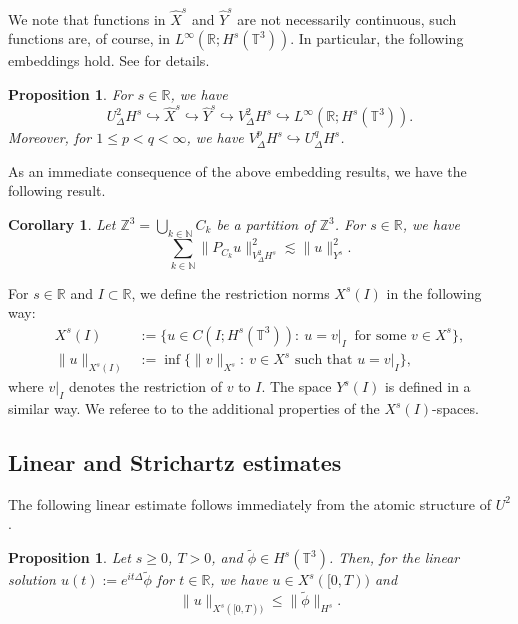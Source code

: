\documentclass[letterpaper, 11pt,  reqno]{amsart}
\newtheorem{proposition}[theorem]{Proposition}
\newtheorem{corollary}[theorem]{Corollary}
\newcommand{\1}{\hspace{0.5mm}\text{I}\hspace{0.5mm}}
\newcommand{\Z}{\mathbb{Z}}
\newcommand{\R}{\mathbb{R}}
\newcommand{\T}{\mathbb{T}}
\newcommand{\Dl}{\Delta}
\newcommand{\ft}{\widehat}
\newcommand{\wt}{\widetilde}
\newcommand{\les}{\lesssim}
\newcommand{\N}{\mathbb{N}}
\numberwithin{equation}{section}
\numberwithin{theorem}{section}
\begin{document}
We note that functions in $\ft X^{s} $ and $\ft Y^{s} $
are not necessarily continuous, 
such functions are, 
 of course, in $L^\infty (\R; H^s (\T^3))$.
 In particular,
the following embeddings hold. See \cite{HTT11} for details.

\begin{proposition}\label{Prop:emb}
For $s \in \R$,
we have
\[
   U^2_\Delta H^s \hookrightarrow \ft X^s \hookrightarrow \ft Y^s
  \hookrightarrow V^2_\Delta H^s
  \hookrightarrow L^\infty (\R; H^s (\T^3)).
\]
Moreover, for  $1\leq p<q <\infty$,
we have $V^p_{\Dl} H^s \hookrightarrow U^q_{\Dl}H^s$.


\end{proposition}


As an immediate consequence of the above embedding results, 
we have the following result.

\begin{corollary}\label{est-Ys}
Let $\Z^3 = \bigcup_{k \in \N} C_k$ be a partition of $\Z^3$.
For $s \in \R$,
we have
\[
   \sum_{k \in \N} \| P_{C_k} u\|_{V^2_\Delta H^s}^2 \les   \| u\|^2_{Y^s}.
\]
\end{corollary}


For $s \in \R$ and $I\subset \R$,
we define the  restriction norms $X^s(I)$ in the following way:
\begin{equation}
\begin{aligned}
X^s(I)
&:= \{u\in C(I; H^s (\T^3)):
    \ u = v|_I \ \text{ for some } v \in X^s \},
\\
\| u \|_{X^s(I)}
&:=
\inf \{ \| v \|_{X^s} :
\ v \in X^s \text{ such that } u= v|_I \}
,
\end{aligned}
\label{XI}
\end{equation}
where $v|_I$ denotes the restriction of $v$ to $I$.
The space $Y^s(I)$ is defined in a similar way. 
We referee to \cite[Appendix A]{BOP15} to the additional
properties of the $X^s(I)$-spaces.


\subsection{Linear and Strichartz estimates}




The following linear estimate follows immediately from the atomic structure of $U^2$.


\begin{proposition}\label{Prop:linear}
  Let $s\geq 0$, $T>0$, and $\wt\phi \in H^s(\T^3)$. Then, for
  the linear solution $u(t) := e^{it\Delta} \wt\phi$ 
  for $t \in \R$, we have
  $u \in X^s([0,T))$ and
\[
    \|u\|_{X^s([0,T))}\leq \| \wt\phi\|_{H^s}.
\]
\end{proposition}
\end{document}

